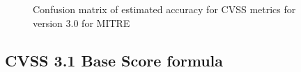 \documentclass[12pt]{article}
\begin{document}
\begin{figure}[H]
	\centering
	\caption{\label{fig:mitre_30_confusion_matrices}Confusion matrix of estimated accuracy for CVSS
		metrics for version 3.0 for MITRE}
\end{figure}



\subsection{CVSS 3.1 Base Score formula} \label{equation}
\end{document}
